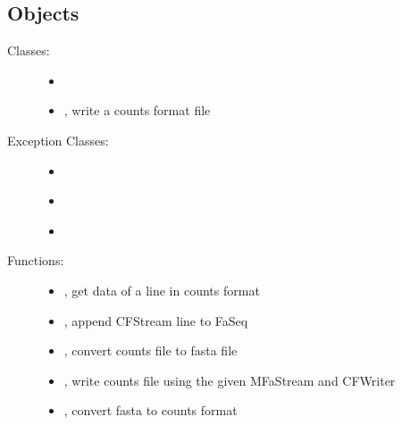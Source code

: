 \documentclass[letterpaper,10pt,english]{sphinxmanual}
\begin{document}
\subsection{Objects}
\label{cf:objects}\begin{description}
\item[{Classes:}] \leavevmode\begin{itemize}
\item {} 
{\hyperref[cf:libPoMo.cf.CFStream]{}}

\item {} 
{\hyperref[cf:libPoMo.cf.CFWriter]{}}, write a counts format file

\end{itemize}

\item[{Exception Classes:}] \leavevmode\begin{itemize}
\item {} 
{\hyperref[cf:libPoMo.cf.NotACountsFormatFileError]{}}

\item {} 
{\hyperref[cf:libPoMo.cf.CountsFormatWriterError]{}}

\item {} 
{\hyperref[cf:libPoMo.cf.NoSynBase]{}}

\end{itemize}

\item[{Functions:}] \leavevmode\begin{itemize}
\item {} 
{\hyperref[cf:libPoMo.cf.interpret_cf_line]{}}, get data of a line in counts format

\item {} 
{\hyperref[cf:libPoMo.cf.faseq_append_base_of_cfS]{}}, append CFStream line to FaSeq

\item {} 
{\hyperref[cf:libPoMo.cf.cf_to_fasta]{}}, convert counts file to fasta file

\item {} 
{\hyperref[cf:libPoMo.cf.write_cf_from_MFaStream]{}}, write counts file using the
given MFaStream and CFWriter

\item {} 
{\hyperref[cf:libPoMo.cf.fasta_to_cf]{}}, convert fasta to counts format

\end{itemize}

\end{description}
\end{document}

